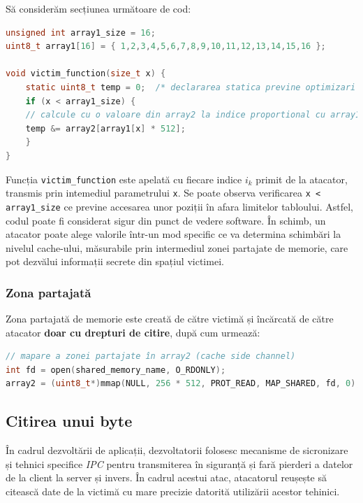 Să considerăm secțiunea următoare de cod:

\begin{lstlisting}[language=c, caption=Secțiune vulnerabila din codul victimei]
unsigned int array1_size = 16;
uint8_t array1[16] = { 1,2,3,4,5,6,7,8,9,10,11,12,13,14,15,16 };

void victim_function(size_t x) {
	static uint8_t temp = 0;  /* declararea statica previne optimizari neprevazute ale compilatorului */
	if (x < array1_size) {
    // calcule cu o valoare din array2 la indice proportional cu array1[x]
    temp &= array2[array1[x] * 512];
	}
}
\end{lstlisting}

Funcția \texttt{victim\_function} este apelată cu fiecare indice $i_k$ primit de
la atacator, transmis prin intemediul parametrului \texttt{x}. Se poate
observa verificarea \texttt{x < array1\_size} ce previne accesarea unor
poziții în afara limitelor tabloului. Astfel, codul poate fi considerat
sigur din punct de vedere software. În schimb, un atacator poate alege 
valorile într-un mod specific ce va determina schimbări la nivelul cache-ului,
măsurabile prin intermediul zonei partajate de memorie, care pot dezvălui 
informații secrete din spațiul victimei.

\subsubsection{Zona partajată}

Zona partajată de memorie este creată de către victimă și încărcată de către
atacator \textbf{doar cu drepturi de citire}, după cum urmează:

\begin{lstlisting}[language=c, caption=Maparea zonei partajate în atacator]
// mapare a zonei partajate în array2 (cache side channel)
int fd = open(shared_memory_name, O_RDONLY);
array2 = (uint8_t*)mmap(NULL, 256 * 512, PROT_READ, MAP_SHARED, fd, 0);
\end{lstlisting}

\subsection{Citirea unui byte}

În cadrul dezvoltării de aplicații, dezvoltatorii folosesc mecanisme de sicronizare și tehnici
specifice \emph{IPC} pentru transmiterea în siguranță și fară pierderi a datelor
de la client la server și invers. În cadrul acestui atac, atacatorul reușește
să citească date de la victimă cu mare precizie datorită utilizării acestor
tehinici.

